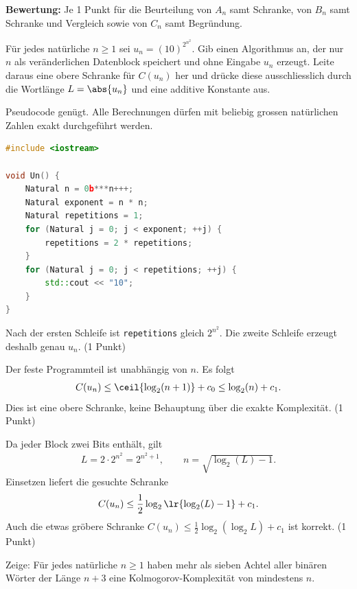 \begin{questions}
\begin{solution}
		\textbf{Bewertung:} Je 1 Punkt für die Beurteilung von $A_n$ samt Schranke, von $B_n$ samt Schranke und Vergleich sowie von $C_n$ samt Begründung.
	\end{solution}

	\question[3]
	Für jedes natürliche $n\geq1$ sei $u_n=(10)^{2^{n^2}}$. Gib einen Algorithmus an, der nur $n$ als veränderlichen Datenblock speichert und ohne Eingabe $u_n$ erzeugt. Leite daraus eine obere Schranke für $C(u_n)$ her und drücke diese ausschliesslich durch die Wortlänge $L=\abs{u_n}$ und eine additive Konstante aus.

	Pseudocode genügt. Alle Berechnungen dürfen mit beliebig grossen natürlichen Zahlen exakt durchgeführt werden.
	\begin{solution}
		\begin{lstlisting}[language=C++,basicstyle=\ttfamily\small]
#include <iostream>

void Un() {
    Natural n = 0b***n+++;
    Natural exponent = n * n;
    Natural repetitions = 1;
    for (Natural j = 0; j < exponent; ++j) {
        repetitions = 2 * repetitions;
    }
    for (Natural j = 0; j < repetitions; ++j) {
        std::cout << "10";
    }
}
		\end{lstlisting}
		Nach der ersten Schleife ist \texttt{repetitions} gleich $2^{n^2}$. Die zweite Schleife erzeugt deshalb genau $u_n$. (1 Punkt)

		Der feste Programmteil ist unabhängig von $n$. Es folgt
		\begin{align*}
			C(u_n)\leq\ceil{\log_2(n+1)}+c_0\leq\log_2(n)+c_1.
		\end{align*}
		Dies ist eine obere Schranke, keine Behauptung über die exakte Komplexität. (1 Punkt)

		Da jeder Block zwei Bits enthält, gilt
		\begin{align*}
			L=2\cdot2^{n^2}=2^{n^2+1},
			\qquad n=\sqrt{\log_2(L)-1}.
		\end{align*}
		Einsetzen liefert die gesuchte Schranke
		\begin{align*}
			C(u_n)\leq\frac{1}{2}\log_2\lr{\log_2(L)-1}+c_1.
		\end{align*}
		Auch die etwas gröbere Schranke $C(u_n)\leq\frac12\log_2(\log_2 L)+c_1$ ist korrekt. (1 Punkt)
	\end{solution}

	\clearpage
	\question[1\half]
	Zeige: Für jedes natürliche $n\geq1$ haben mehr als sieben Achtel aller binären Wörter der Länge $n+3$ eine Kolmogorov-Komplexität von mindestens $n$.


\end{questions}

